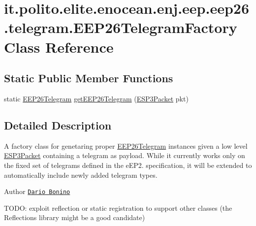 \hypertarget{classit_1_1polito_1_1elite_1_1enocean_1_1enj_1_1eep_1_1eep26_1_1telegram_1_1_e_e_p26_telegram_factory}{}\section{it.\+polito.\+elite.\+enocean.\+enj.\+eep.\+eep26.\+telegram.\+E\+E\+P26\+Telegram\+Factory Class Reference}
\label{classit_1_1polito_1_1elite_1_1enocean_1_1enj_1_1eep_1_1eep26_1_1telegram_1_1_e_e_p26_telegram_factory}
\subsection*{Static Public Member Functions}
\begin{DoxyCompactItemize}
\item 
static \hyperlink{classit_1_1polito_1_1elite_1_1enocean_1_1enj_1_1eep_1_1eep26_1_1telegram_1_1_e_e_p26_telegram}{E\+E\+P26\+Telegram} \hyperlink{classit_1_1polito_1_1elite_1_1enocean_1_1enj_1_1eep_1_1eep26_1_1telegram_1_1_e_e_p26_telegram_factory_a8024e4162ca2a609f3ac501eafdf728a}{get\+E\+E\+P26\+Telegram} (\hyperlink{classit_1_1polito_1_1elite_1_1enocean_1_1protocol_1_1serial_1_1v3_1_1network_1_1packet_1_1_e_s_p3_packet}{E\+S\+P3\+Packet} pkt)
\end{DoxyCompactItemize}


\subsection{Detailed Description}
A factory class for genetaring proper \hyperlink{classit_1_1polito_1_1elite_1_1enocean_1_1enj_1_1eep_1_1eep26_1_1telegram_1_1_e_e_p26_telegram}{E\+E\+P26\+Telegram} instances given a low level \hyperlink{}{E\+S\+P3\+Packet} containing a telegram as payload. While it currently works only on the fixed set of telegrams defined in the e\+E\+P2. specification, it will be extended to automatically include newly added telegram types.

\begin{DoxyAuthor}{Author}
\href{mailto:dario.bonino@gmail.com}{\tt Dario Bonino} \begin{DoxyVerb}    TODO: exploit reflection or static registration to support other
    classes (the Reflections library might be a good candidate)\end{DoxyVerb}
 
\end{DoxyAuthor}


